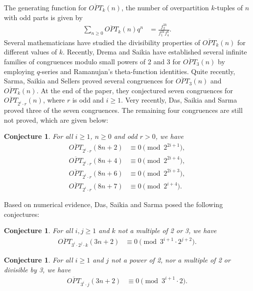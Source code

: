 \documentclass[12pt,reqno,a4paper]{amsart}
\newtheorem{conjecture}[theorem]{Conjecture}
\numberwithin{equation}{section}
\begin{document}
The generating function for $\overline{OPT}_k(n)$, the number of overpartition $k$-tuples of $n$ with odd parts is given by
\begin{align}\label{LL1}
    \sum_{n\geq 0}\overline{OPT}_k(n)q^n&= \frac{f_2^{3k}}{f_1^{2k}f_4^k}.
\end{align} 
Several mathematicians have studied the divisibility properties of $\overline{OPT}_k(n)$ for different values of $k$. Recently, Drema and Saikia \cite{drema} have established several infinite families of congruences modulo
small powers of 2 and 3 for  $\overline{OPT}_3(n)$
by employing $q$-series
and Ramanujan’s theta-function identities. Quite recently, Sarma, Saikia and Sellers \cite{saikiasarma} proved several congruences for $\overline{OPT}_3(n)$ and $\overline{OPT}_k(n)$. At the end of the paper, they conjectured seven congruences for $ \overline{OPT}_{2^i\cdot r}(n)$, where $r$ is odd and $i\geq 1$. Very recently, Das, Saikia and Sarma \cite{DSS} proved three of the seven congruences. The remaining four congruences are still not proved, which are given below:
    \begin{conjecture}\label{Con2}
    For all $i\geq 1$, $n\geq 0$ and odd $r>0$, we have
    \begin{align*}
\overline{OPT}_{2^i\cdot r}(8n+2)& \equiv 0 \pmod{2^{2i+1}},\\
  \overline{OPT}_{2^i\cdot r}(8n+4)& \equiv 0 \pmod{2^{2i+4}},\\
 \overline{OPT}_{2^i\cdot r}(8n+6)& \equiv 0 \pmod{2^{2i+3}},\\  \overline{OPT}_{2^i\cdot r}(8n+7)& \equiv 0 \pmod{2^{i+4}}.
    \end{align*}
\end{conjecture}
 Based on numerical evidence, Das, Saikia and Sarma \cite{DSS} posed the following conjectures:
 \begin{conjecture}\label{Con3}
    For all $i,j\geq 1$ and $k$ not a multiple of 2 or 3, we have
    \begin{align}
 \label{H1}   \overline{OPT}_{3^i\cdot 2^j\cdot k}(3n+2)& \equiv 0 \pmod{3^{i+1}\cdot 2^{j+2}}.
    \end{align}
\end{conjecture}
\begin{conjecture}\label{Con4}
    For all $i\geq 1$ and $j$ not a power of 2,  nor a multiple of 2 or divisible by 3, we have
    \begin{align}
 \label{H2}   \overline{OPT}_{3^i\cdot j}(3n+2)& \equiv 0 \pmod{3^{i+1}\cdot 2}.
    \end{align}
\end{conjecture}
\end{document}
